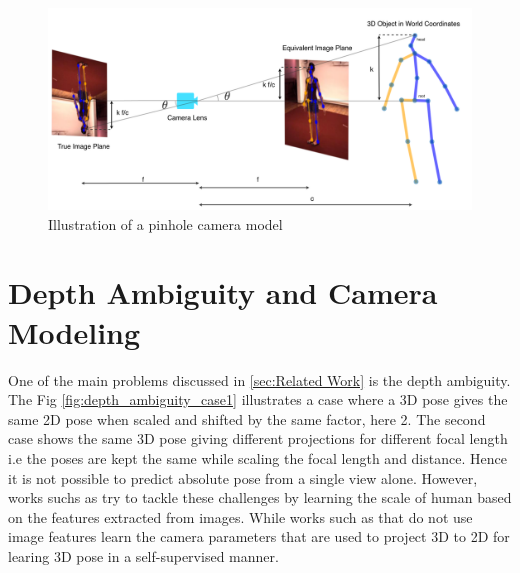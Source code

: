 \begin{figure}[h]
    \centering
    \includegraphics[scale=0.2]{figures/background/pinhole.png}
    \caption{Illustration of a pinhole camera model}
    \label{fig:pinhole}
\end{figure}

\section{Depth Ambiguity and Camera Modeling}
\label{depth_ambiguity_camera_modeling}
One of the main problems discussed in \ref{sec:Related Work} is the depth ambiguity. The Fig \ref{fig:depth_ambiguity_case1} illustrates a case where a 3D pose gives the same 2D pose when scaled and shifted by the same factor, here 2. The second case shows the same 3D pose giving different projections for different focal length i.e the poses are kept the same while scaling the focal length and distance. Hence it is not possible to predict absolute pose from a single view alone. However, works suchs as \cite{CameraDistanceAware} try to tackle these challenges by learning the scale of human based on the features extracted from images. While works such as \cite{repnet,weaklymultiple} that do not use image features learn the camera parameters that are used to project 3D to 2D for learing 3D pose in a self-supervised manner. 

